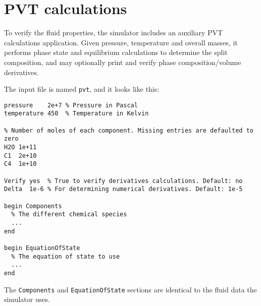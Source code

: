 \chapter{PVT calculations}
\label{chapter:pvt}

To verify the fluid properties, the simulator includes an auxiliary
PVT calculations application. Given pressure, temperature and overall
masses, it performs phase state and equilibrium calculations to
determine the split composition, and may optionally print and verify
phase composition/volume derivatives.

The input file is named \texttt{pvt}, and it looks like this:
\begin{verbatim}
pressure    2e+7 % Pressure in Pascal
temperature 450  % Temperature in Kelvin

% Number of moles of each component. Missing entries are defaulted to zero
H2O 1e+11
C1  2e+10
C4  1e+10

Verify yes  % True to verify derivatives calculations. Default: no
Delta  1e-6 % For determining numerical derivatives. Default: 1e-5

begin Components
  % The different chemical species
  ...
end

begin EquationOfState
  % The equation of state to use
  ...
end
\end{verbatim}

The \texttt{Components} and \texttt{EquationOfState} sections are
identical to the fluid data the simulator uses.

